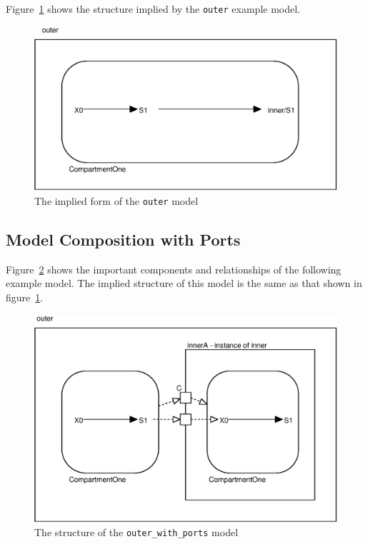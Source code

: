 \documentclass{cekarticle}
\begin{document}
Figure~\ref{fig:eg-implied} shows the structure implied by the \texttt{outer} example model.

\begin{figure}[h]
  \vspace*{8pt}
  \centering
  \includegraphics[scale = 0.7]{eg-implied}
  \caption{The implied form of the \texttt{outer} model}
  \label{fig:eg-implied}
\end{figure}

\subsection{Model Composition with Ports}
\label{sec:egwithports}

Figure~\ref{fig:egwithports} shows the important components and relationships of the following example model.
The implied structure of this model is the same as that shown in figure~\ref{fig:eg-implied}.
\begin{figure}[h]
  \vspace*{8pt}
  \centering
  \includegraphics[scale = 0.7]{egwithports}
  \caption{The structure of the \texttt{outer\_with\_ports} model}
  \label{fig:egwithports}
\end{figure}
\end{document}
